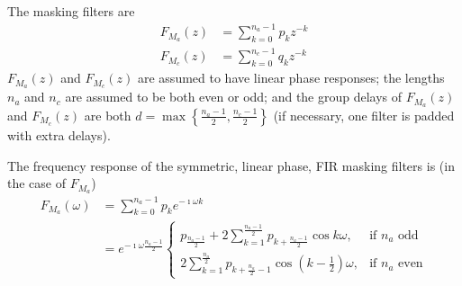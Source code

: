 \documentclass[a4paper,twoside,10pt,english]{report}
\begin{document}
The masking filters are 
\begin{align*}
F_{M_{a}}\left(z\right)&=\sum_{k=0}^{n_{a}-1}p_{k}z^{-k}\\
F_{M_{c}}\left(z\right)&=\sum_{k=0}^{n_{c}-1}q_{k}z^{-k}
\end{align*}
$F_{M_{a}}\left(z\right)$ and $F_{M_{c}}\left(z\right)$ are assumed to have linear
phase responses; the lengths $n_{a}$ and $n_{c}$ are assumed to be both even
or odd; and the group delays of $F_{M_{a}}\left(z\right)$ and 
$F_{M_{c}}\left(z\right)$ are both 
$d=\max\left\{\frac{n_{a}-1}{2},\frac{n_{c}-1}{2}\right\}$ (if necessary, one 
filter is padded with extra delays).

The frequency response of the symmetric, linear phase, FIR masking filters
is (in the case of $F_{M_{a}}$)
\begin{align*}
F_{M_{a}} \left(\omega\right) &= \sum _{k=0}^{n_{a}-1}p_{k}e^{-\imath\omega k}\\
&= e^{-\imath\omega\frac{n_{a}-1}{2}}\begin{cases}
p_{\frac{n_{a}-1}{2}}+2\sum_{k=1}^{\frac{n_{a}-1}{2}}
p_{k+\frac{n_{a}-1}{2}}\cos k\omega,&\text{if $n_{a}$ odd}\\
2\sum_{k=1}^{\frac{n_{a}}{2}}
p_{k+\frac{n_{a}}{2}-1}\cos \left(k-\frac{1}{2}\right)\omega,
&\text{if $n_{a}$ even}
\end{cases}
\end{align*}
\end{document}
